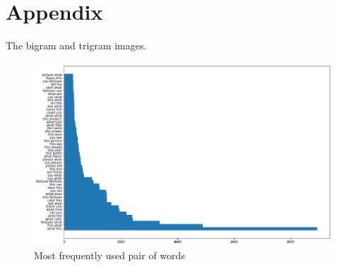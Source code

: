 \documentclass[sigconf]{acmart}
\begin{document}

 
\newpage
\appendix
\section{Appendix}

The bigram and trigram images. 
\begin{figure}[bp]
        \centering
        \includegraphics[scale=0.45]{images/bigram_all.png}  
        \caption{Most frequently used pair of words} 
          \label{fig:bi_all}   
\end{figure}
\end{document}
